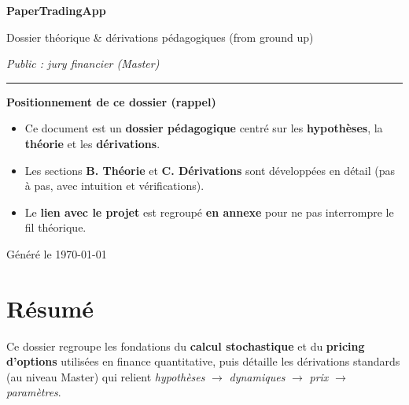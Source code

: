 \documentclass[11pt,a4paper]{report}
\theoremstyle{definition}
\theoremstyle{plain}
\theoremstyle{remark}
\newcommand{\1}{\mathbf{1}}
\begin{document}
\begin{titlepage}
\centering
\vspace*{2cm}
{\Large\bfseries PaperTradingApp\par}
\vspace{0.4cm}
{\large Dossier théorique \& dérivations pédagogiques (from ground up)\par}
\vspace{1.2cm}
{\large\itshape Public : jury financier (Master)\par}
\vspace{1.0cm}

\noindent\rule{0.9\textwidth}{0.4pt}\par
\vspace{0.6cm}

\begin{minipage}{0.9\textwidth}
\small
\textbf{Positionnement de ce dossier (rappel)}\par
\begin{itemize}[leftmargin=*]
\item Ce document est un \textbf{dossier pédagogique} centré sur les \textbf{hypothèses}, la \textbf{théorie} et les \textbf{dérivations}.
\item Les sections \textbf{B. Théorie} et \textbf{C. Dérivations} sont développées en détail (pas à pas, avec intuition et vérifications).
\item Le \textbf{lien avec le projet} est regroupé \textbf{en annexe} pour ne pas interrompre le fil théorique.
\end{itemize}
\end{minipage}

\vfill
{\small Généré le \today\par}
\end{titlepage}

\chapter*{Résumé}
Ce dossier regroupe les fondations du \textbf{calcul stochastique} et du \textbf{pricing d'options} utilisées en finance quantitative, puis détaille les dérivations standards (au niveau Master) qui relient \emph{hypothèses} $\to$ \emph{dynamiques} $\to$ \emph{prix} $\to$ \emph{paramètres}.
\end{document}
